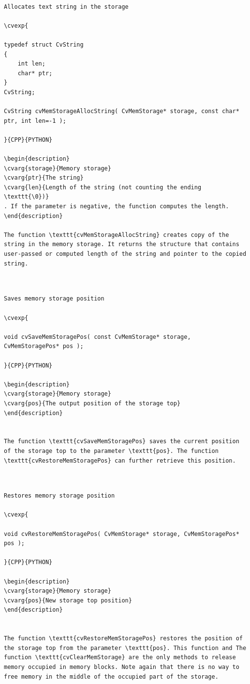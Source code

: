 \label{MemStorageAllocString}
\begin{verbatim}

Allocates text string in the storage

\cvexp{

typedef struct CvString
{
    int len;
    char* ptr;
}
CvString;

CvString cvMemStorageAllocString( CvMemStorage* storage, const char* ptr, int len=-1 );

}{CPP}{PYTHON}

\begin{description}
\cvarg{storage}{Memory storage}
\cvarg{ptr}{The string}
\cvarg{len}{Length of the string (not counting the ending \texttt{\0})}
. If the parameter is negative, the function computes the length.
\end{description}

The function \texttt{cvMemStorageAllocString} creates copy of the string in the memory storage. It returns the structure that contains user-passed or computed length of the string and pointer to the copied string.


\end{verbatim}
\label{SaveMemStoragePos}
\begin{verbatim}

Saves memory storage position

\cvexp{

void cvSaveMemStoragePos( const CvMemStorage* storage, CvMemStoragePos* pos );

}{CPP}{PYTHON}

\begin{description}
\cvarg{storage}{Memory storage}
\cvarg{pos}{The output position of the storage top}
\end{description}


The function \texttt{cvSaveMemStoragePos} saves the current position of the storage top to the parameter \texttt{pos}. The function \texttt{cvRestoreMemStoragePos} can further retrieve this position.


\end{verbatim}
\label{RestoreMemStoragePos}
\begin{verbatim}

Restores memory storage position

\cvexp{

void cvRestoreMemStoragePos( CvMemStorage* storage, CvMemStoragePos* pos );

}{CPP}{PYTHON}

\begin{description}
\cvarg{storage}{Memory storage}
\cvarg{pos}{New storage top position}
\end{description}


The function \texttt{cvRestoreMemStoragePos} restores the position of the storage top from the parameter \texttt{pos}. This function and The function \texttt{cvClearMemStorage} are the only methods to release memory occupied in memory blocks. Note again that there is no way to free memory in the middle of the occupied part of the storage.


\end{verbatim}
